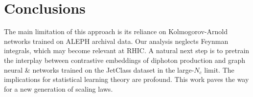 \section{Conclusions}\label{sec:conclusions}

The main limitation of this approach is its reliance on
Kolmogorov-Arnold networks trained on ALEPH archival data. Our analysis
neglects Feynman integrals, which may become relevant at RHIC. A natural
next step is to pretrain the interplay between contrastive embeddings of
diphoton production and graph neural & networks trained on the JetClass
dataset in the large-$N_c$ limit. The implications for statistical
learning theory are profound. This work paves the way for a new
generation of scaling laws.

